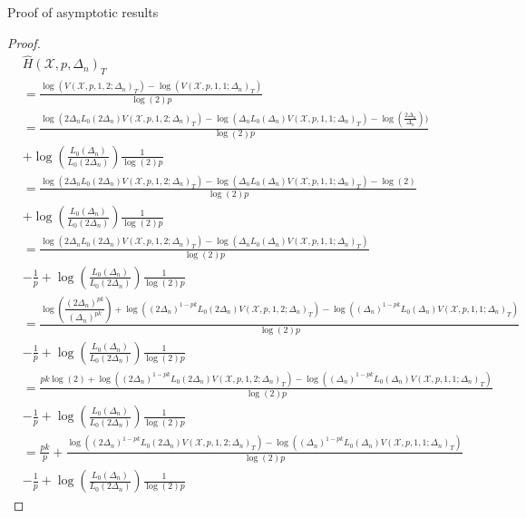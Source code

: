 \documentclass[fleqn,11pt,letterpaper]{article}
\theoremstyle{plain}
\theoremstyle{definition}
\theoremstyle{remark}
\numberwithin{equation}{section}
\begin{document}
\begin{section}{Proof of asymptotic results}
\begin{proof}
\begin{equation}
    \begin{split}
        &\hat{H}(\mathcal{X},p,\Delta_n)_T \\
        &= \frac{\log(V(\mathcal{X},p,1,2;\Delta_n)_T) - \log(V(\mathcal{X},p,1,1;\Delta_n)_T)}{\log(2)p} \\
        &= \frac{\log(2\Delta_nL_0(2\Delta_n)V(\mathcal{X},p,1,2;\Delta_n)_T) - \log(\Delta_nL_0(\Delta_n)V(\mathcal{X},p,1,1;\Delta_n)_T)-\log(\frac{2\Delta_n}{\Delta_n}))}{\log(2)p}\\
        &+ \log\left(\frac{L_0(\Delta_n)}{L_0(2\Delta_n)}\right)\frac{1}{\log(2)p} \\
        &= \frac{\log(2\Delta_nL_0(2\Delta_n)V(\mathcal{X},p,1,2;\Delta_n)_T) - \log(\Delta_nL_0(\Delta_n)V(\mathcal{X},p,1,1;\Delta_n)_T)-\log(2)}{\log(2)p} \\
        &+ \log\left(\frac{L_0(\Delta_n)}{L_0(2\Delta_n)}\right)\frac{1}{\log(2)p} \\
        &= \frac{\log(2\Delta_nL_0(2\Delta_n)V(\mathcal{X},p,1,2;\Delta_n)_T) - \log(\Delta_nL_0(\Delta_n)V(\mathcal{X},p,1,1;\Delta_n)_T)}{\log(2)p} \\
        &- \frac{1}{p} + \log\left(\frac{L_0(\Delta_n)}{L_0(2\Delta_n)}\right)\frac{1}{\log(2)p} \\
        &= \frac{\log\left(\dfrac{\left(2\Delta_n\right)^{pk}}{\left(\Delta_n\right)^{pk}}\right) + \log(\left(2\Delta_n\right)^{1-pk}L_0(2\Delta_n)V(\mathcal{X},p,1,2;\Delta_n)_T) - \log(\left(\Delta_n\right)^{1-pk}L_0(\Delta_n)V(\mathcal{X},p,1,1;\Delta_n)_T)}{\log(2)p} \\
        &- \frac{1}{p} + \log\left(\frac{L_0(\Delta_n)}{L_0(2\Delta_n)}\right)\frac{1}{\log(2)p} \\
        &= \frac{pk\log(2) + \log(\left(2\Delta_n\right)^{1-pk}L_0(2\Delta_n)V(\mathcal{X},p,1,2;\Delta_n)_T) - \log(\left(\Delta_n\right)^{1-pk}L_0(\Delta_n)V(\mathcal{X},p,1,1;\Delta_n)_T)}{\log(2)p} \\
        &- \frac{1}{p}+ \log\left(\frac{L_0(\Delta_n)}{L_0(2\Delta_n)}\right)\frac{1}{\log(2)p} \\
        &= \frac{pk}{p}+ \frac{\log(\left(2\Delta_n\right)^{1-pk}L_0(2\Delta_n)V(\mathcal{X},p,1,2;\Delta_n)_T) - \log(\left(\Delta_n\right)^{1-pk}L_0(\Delta_n)V(\mathcal{X},p,1,1;\Delta_n)_T)}{\log(2)p} \\
        &- \frac{1}{p} + \log\left(\frac{L_0(\Delta_n)}{L_0(2\Delta_n)}\right)\frac{1}{\log(2)p}
    \end{split}
\end{equation}


\end{proof}
\end{section}
\end{document}
